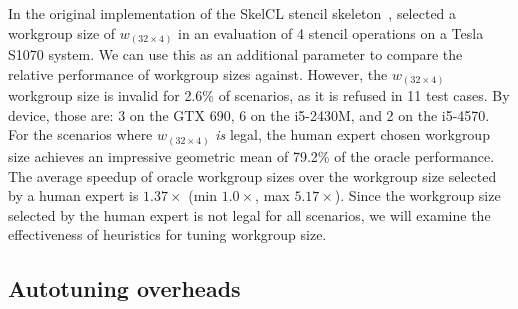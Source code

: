 \documentclass[nonatbib,preprint,9pt]{sigplanconf}
\begin{document}

In the original implementation of the SkelCL stencil
skeleton~\cite{Breuer2013}, \citeauthor{Breuer2013} selected a
workgroup size of $w_{(32 \times 4)}$ in an evaluation of 4 stencil
operations on a Tesla S1070 system. We can use this as an additional
parameter to compare the relative performance of workgroup sizes
against. However, the $w_{(32 \times 4)}$ workgroup size is invalid
for 2.6\% of scenarios, as it is refused in 11 test cases. By device,
those are: 3 on the GTX 690, 6 on the i5-2430M, and 2 on the i5-4570.
For the scenarios where $w_{(32 \times 4)}$ \emph{is} legal, the human
expert chosen workgroup size achieves an impressive geometric mean of
79.2\% of the oracle performance. The average speedup of oracle
workgroup sizes over the workgroup size selected by a human expert is
$1.37\times$ (min $1.0\times$, max $5.17\times$). Since the workgroup
size selected by the human expert is not legal for all scenarios, we
will examine the effectiveness of heuristics for tuning workgroup
size.


\subsection{Autotuning overheads}
\end{document}
